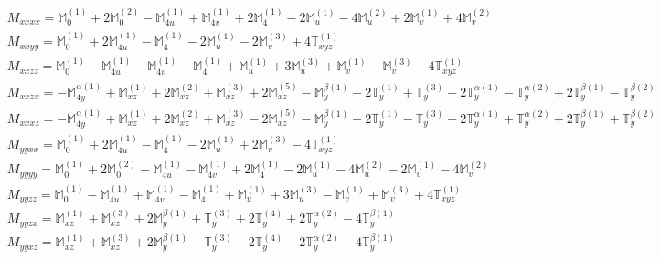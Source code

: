 \documentclass[fleqn,8pt,landscape]{jsarticle}
\begin{document}
\begin{align*}
& M_{xxxx} = \mathbb{M}_{0}^{(1)} + 2 \mathbb{M}_{0}^{(2)} - \mathbb{M}_{4u}^{(1)} + \mathbb{M}_{4v}^{(1)} + 2 \mathbb{M}_{4}^{(1)} - 2 \mathbb{M}_{u}^{(1)} - 4 \mathbb{M}_{u}^{(2)} + 2 \mathbb{M}_{v}^{(1)} + 4 \mathbb{M}_{v}^{(2)} \\
& M_{xxyy} = \mathbb{M}_{0}^{(1)} + 2 \mathbb{M}_{4u}^{(1)} - \mathbb{M}_{4}^{(1)} - 2 \mathbb{M}_{u}^{(1)} - 2 \mathbb{M}_{v}^{(3)} + 4 \mathbb{T}_{xyz}^{(1)} \\
& M_{xxzz} = \mathbb{M}_{0}^{(1)} - \mathbb{M}_{4u}^{(1)} - \mathbb{M}_{4v}^{(1)} - \mathbb{M}_{4}^{(1)} + \mathbb{M}_{u}^{(1)} + 3 \mathbb{M}_{u}^{(3)} + \mathbb{M}_{v}^{(1)} - \mathbb{M}_{v}^{(3)} - 4 \mathbb{T}_{xyz}^{(1)} \\
& M_{xxzx} = - \mathbb{M}_{4y}^{\alpha(1)} + \mathbb{M}_{xz}^{(1)} + 2 \mathbb{M}_{xz}^{(2)} + \mathbb{M}_{xz}^{(3)} + 2 \mathbb{M}_{xz}^{(5)} - \mathbb{M}_{y}^{\beta(1)} - 2 \mathbb{T}_{y}^{(1)} + \mathbb{T}_{y}^{(3)} + 2 \mathbb{T}_{y}^{\alpha(1)} - \mathbb{T}_{y}^{\alpha(2)} + 2 \mathbb{T}_{y}^{\beta(1)} - \mathbb{T}_{y}^{\beta(2)} \\
& M_{xxxz} = - \mathbb{M}_{4y}^{\alpha(1)} + \mathbb{M}_{xz}^{(1)} + 2 \mathbb{M}_{xz}^{(2)} + \mathbb{M}_{xz}^{(3)} - 2 \mathbb{M}_{xz}^{(5)} - \mathbb{M}_{y}^{\beta(1)} - 2 \mathbb{T}_{y}^{(1)} - \mathbb{T}_{y}^{(3)} + 2 \mathbb{T}_{y}^{\alpha(1)} + \mathbb{T}_{y}^{\alpha(2)} + 2 \mathbb{T}_{y}^{\beta(1)} + \mathbb{T}_{y}^{\beta(2)} \\
& M_{yyxx} = \mathbb{M}_{0}^{(1)} + 2 \mathbb{M}_{4u}^{(1)} - \mathbb{M}_{4}^{(1)} - 2 \mathbb{M}_{u}^{(1)} + 2 \mathbb{M}_{v}^{(3)} - 4 \mathbb{T}_{xyz}^{(1)} \\
& M_{yyyy} = \mathbb{M}_{0}^{(1)} + 2 \mathbb{M}_{0}^{(2)} - \mathbb{M}_{4u}^{(1)} - \mathbb{M}_{4v}^{(1)} + 2 \mathbb{M}_{4}^{(1)} - 2 \mathbb{M}_{u}^{(1)} - 4 \mathbb{M}_{u}^{(2)} - 2 \mathbb{M}_{v}^{(1)} - 4 \mathbb{M}_{v}^{(2)} \\
& M_{yyzz} = \mathbb{M}_{0}^{(1)} - \mathbb{M}_{4u}^{(1)} + \mathbb{M}_{4v}^{(1)} - \mathbb{M}_{4}^{(1)} + \mathbb{M}_{u}^{(1)} + 3 \mathbb{M}_{u}^{(3)} - \mathbb{M}_{v}^{(1)} + \mathbb{M}_{v}^{(3)} + 4 \mathbb{T}_{xyz}^{(1)} \\
& M_{yyzx} = \mathbb{M}_{xz}^{(1)} + \mathbb{M}_{xz}^{(3)} + 2 \mathbb{M}_{y}^{\beta(1)} + \mathbb{T}_{y}^{(3)} + 2 \mathbb{T}_{y}^{(4)} + 2 \mathbb{T}_{y}^{\alpha(2)} - 4 \mathbb{T}_{y}^{\beta(1)} \\
& M_{yyxz} = \mathbb{M}_{xz}^{(1)} + \mathbb{M}_{xz}^{(3)} + 2 \mathbb{M}_{y}^{\beta(1)} - \mathbb{T}_{y}^{(3)} - 2 \mathbb{T}_{y}^{(4)} - 2 \mathbb{T}_{y}^{\alpha(2)} - 4 \mathbb{T}_{y}^{\beta(1)} \\

\end{align*}
\end{document}
